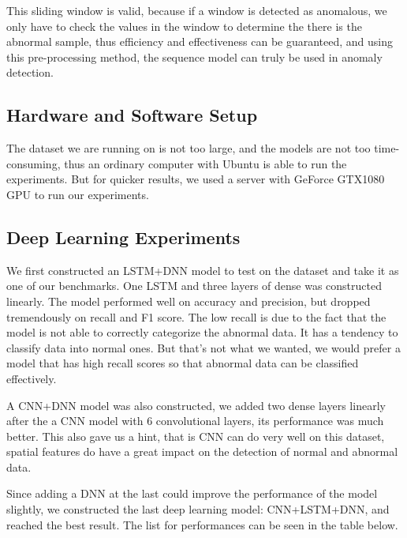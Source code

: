 \documentclass{acmtog} %
\begin{document}
This sliding window is valid, because if a window is detected as anomalous, we only have to check the values in the window to determine the there is the abnormal sample, thus efficiency and effectiveness can be guaranteed, and using this pre-processing method, the sequence model can truly be used in anomaly detection.

\subsection{Hardware and Software Setup}
The dataset we are running on is not too large, and the models are not too time-consuming, thus an ordinary computer with Ubuntu is able to run the experiments. But for quicker results, we used a server with GeForce GTX1080 GPU to run our experiments. 


\subsection{Deep Learning Experiments}
We first constructed an LSTM+DNN model to test on the dataset and take it as one of our benchmarks. One LSTM and three layers of dense was constructed linearly. The model performed well on accuracy and precision, but dropped tremendously on recall and F1 score. The low recall is due to the fact that the model is not able to correctly categorize the abnormal data. It has a tendency to classify data into normal ones. But that's not what we wanted, we would prefer a model that has high recall scores so that abnormal data can be classified effectively.

A CNN+DNN model was also constructed, we added two dense layers linearly after the a CNN model with 6 convolutional layers, its performance was much better. This also gave us a hint, that is CNN can do very well on this dataset, spatial features do have a great impact on the detection of normal and abnormal data. 

Since adding a DNN at the last could improve the performance of the model slightly, we constructed the last deep learning model: CNN+LSTM+DNN, and reached the best result. The list for performances can be seen in the table below.

\begin{table}[h]
\end{table}
\end{document}
